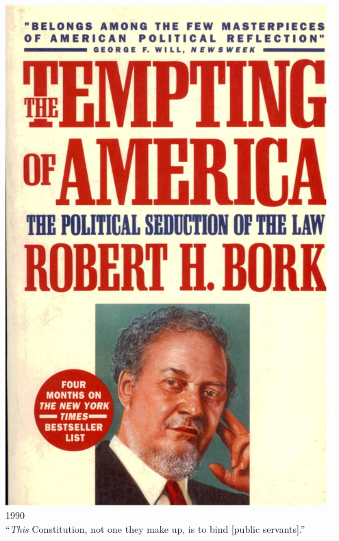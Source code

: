 \begin{frame}
    \begin{columns}[onlytextwidth]
            \centering
            \includegraphics[width=0.95\textwidth]{img/bork-book.jpg} \\
            1990 \\

            ``\emph{This} Constitution, not one they make up, is to bind [public servants].''

    \end{columns}
\end{frame}


